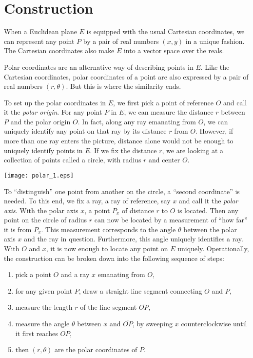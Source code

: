 \documentclass[12pt]{article}
\begin{document}
\section{Construction}
When a Euclidean plane $E$ is equipped with the usual Cartesian
coordinates, we can represent any point $P$ by a pair of real
numbers $(x,y)$ in a unique fashion. The Cartesian coordinates also
make $E$ into a vector space over the reals.

Polar coordinates are an alternative way of describing points in
$E$. Like the Cartesian coordinates, polar coordinates of a point
are also expressed by a pair of real numbers $(r,\theta)$. But this
is where the similarity ends.

To set up the polar coordinates in $E$, we first pick a point of
reference $O$ and call it the \emph{polar origin}. For any point $P$
in $E$, we can measure the distance $r$ between $P$ and the polar
origin $O$. In fact, along any ray emanating from $O$, we can
uniquely identify any point on that ray by its distance $r$ from
$O$. However, if more than one ray enters the picture, distance
alone would not be enough to uniquely identify points in $E$. If we
fix the distance $r$, we are looking at a collection of points
called a circle, with radius $r$ and center $O$.
\begin{center}
\texttt{[image: polar\_1.eps]}
\end{center}
To ``distinguish'' one point from another on the circle, a ``second
coordinate'' is needed. To this end, we fix a ray, a ray of
reference, say $x$ and call it the \emph{polar axis}. With the polar
axis $x$, a point $P_x$ of distance $r$ to $O$ is located. Then any
point on the circle of radius $r$ can now be located by a
measurement of ``how far'' it is from $P_x$. This measurement
corresponds to the angle $\theta$ between the polar axis $x$ and the
ray in question. Furthermore, this angle uniquely identifies a ray.
With $O$ and $x$, it is now enough to locate any point on $E$
uniquely. Operationally, the construction can be broken down into
the following sequence of steps:
\begin{enumerate}
\item pick a point $O$ and a ray $x$ emanating from $O$,
\item for any given point $P$, draw a straight line segment connecting $O$ and $P$,
\item measure the length $r$ of the line segment $\overline{OP}$,
\item measure the angle $\theta$ between $x$ and $\overline{OP}$,
by sweeping $x$ counterclockwise until it first reaches
$\overline{OP}$,
\item then $(r,\theta)$ are the polar coordinates of $P$.
\end{enumerate}
\end{document}
